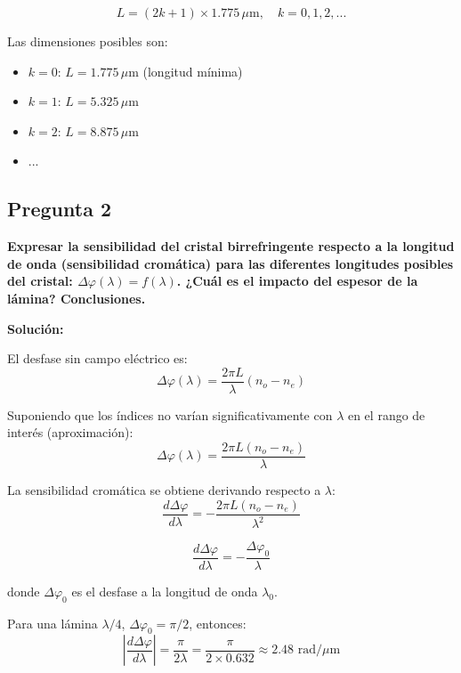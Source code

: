 \documentclass[12pt,a4paper]{article}
\begin{document}
\begin{equation}
\boxed{L = (2k+1) \times 1.775 \, \mu\text{m}, \quad k = 0, 1, 2, ...}
\end{equation}

Las dimensiones posibles son:
\begin{itemize}
    \item $k=0$: $L = 1.775 \, \mu\text{m}$ (longitud mínima)
    \item $k=1$: $L = 5.325 \, \mu\text{m}$
    \item $k=2$: $L = 8.875 \, \mu\text{m}$
    \item ...
\end{itemize}

\subsection*{Pregunta 2}
\textbf{Expresar la sensibilidad del cristal birrefringente respecto a la longitud de onda (sensibilidad cromática) para las diferentes longitudes posibles del cristal: $\Delta\varphi(\lambda) = f(\lambda)$. ¿Cuál es el impacto del espesor de la lámina? Conclusiones.}

\vspace{0.3cm}
\textbf{Solución:}

El desfase sin campo eléctrico es:
\begin{equation}
\Delta\varphi(\lambda) = \frac{2\pi L}{\lambda}(n_o - n_e)
\end{equation}

Suponiendo que los índices no varían significativamente con $\lambda$ en el rango de interés (aproximación):
\begin{equation}
\Delta\varphi(\lambda) = \frac{2\pi L(n_o - n_e)}{\lambda}
\end{equation}

La sensibilidad cromática se obtiene derivando respecto a $\lambda$:
\begin{equation}
\frac{d\Delta\varphi}{d\lambda} = -\frac{2\pi L(n_o - n_e)}{\lambda^2}
\end{equation}

\begin{equation}
\boxed{\frac{d\Delta\varphi}{d\lambda} = -\frac{\Delta\varphi_0}{\lambda}}
\end{equation}

donde $\Delta\varphi_0$ es el desfase a la longitud de onda $\lambda_0$.

Para una lámina $\lambda/4$, $\Delta\varphi_0 = \pi/2$, entonces:
\begin{equation}
\left|\frac{d\Delta\varphi}{d\lambda}\right| = \frac{\pi}{2\lambda} = \frac{\pi}{2 \times 0.632} \approx 2.48 \text{ rad/}\mu\text{m}
\end{equation}
\end{document}
